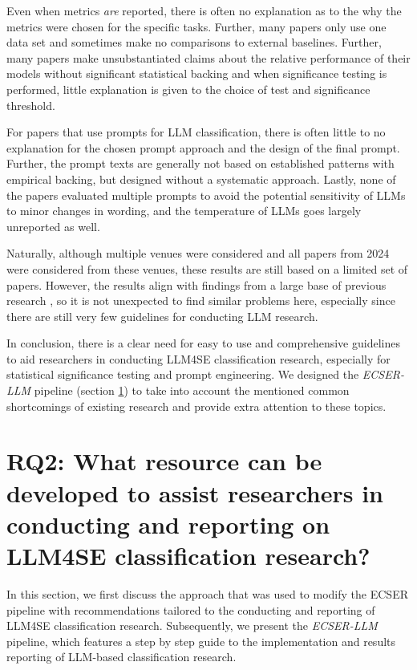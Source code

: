 \documentclass[a4paper]{article}
\newcommand{\newecser}{\textit{ECSER-LLM} }
\begin{document}
Even when metrics \textit{are} reported, there is often no explanation as to the why the metrics were chosen for the specific tasks. Further, many papers only use one data set and sometimes make no comparisons to external baselines. Further, many papers make unsubstantiated claims about the relative performance of their models without significant statistical backing and when significance testing is performed, little explanation is given to the choice of test and significance threshold. 

For papers that use prompts for LLM classification, there is often little to no explanation for the chosen prompt approach and the design of the final prompt. Further, the prompt texts are generally not based on established patterns with empirical backing, but designed without a systematic approach. Lastly, none of the papers evaluated multiple prompts to avoid the potential sensitivity of LLMs to minor changes in wording, and the temperature of LLMs goes largely unreported as well. 

Naturally, although multiple venues were considered and all papers from 2024 were considered from these venues, these results are still based on a limited set of papers. However, the results align with findings from a large base of previous research \cite{Dellanna2022,hou2024,guo2023survey,kitchenham2002,Menzies2012}, so it is not unexpected to find similar problems here, especially since there are still very few guidelines for conducting LLM research.

In conclusion, there is a clear need for easy to use and comprehensive guidelines to aid researchers in conducting LLM4SE classification research, especially for statistical significance testing and prompt engineering. We designed the \newecser pipeline (section \ref{RQ2}) to take into account the mentioned common shortcomings of existing research and provide extra attention to these topics. 

\section{RQ2: What resource can be developed to assist researchers in conducting and reporting on LLM4SE classification research?}
\label{RQ2}
In this section, we first discuss the approach that was used to modify the ECSER pipeline with recommendations tailored to the conducting and reporting of LLM4SE classification research. Subsequently, we present the \newecser pipeline, which features a step by step guide to the implementation and results reporting of LLM-based classification research. 
\end{document}
